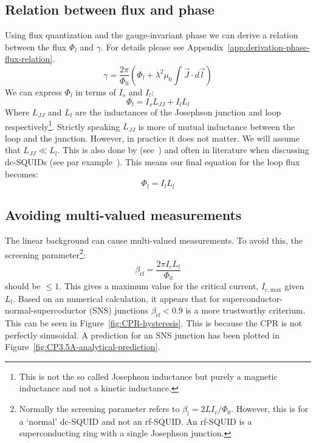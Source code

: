 \subsection{Relation between flux and phase}
\label{sec:flux-phase-relation}
Using flux quantization and the gauge-invariant phase we can derive a relation between the flux $\Phi_l$ and $\gamma$. For details please see Appendix~\ref{app:derivation-phase-flux-relation}.
\begin{equation}
	\gamma = \frac{2\pi}{\Phi_0}\left(\Phi_l + \lambda^2\mu_0 \int \vec{J}\cdot d \vec{l} \right)
	\label{eqn:phase-flux-relation}
\end{equation}
We can express $\Phi_l$ in terms of $I_s$ and $I_l$:
\begin{equation}
	\Phi_l = I_sL_{JJ}  + I_lL_l
\end{equation}
Where $L_{JJ}$ and $L_l$ are the inductances of the Josephson junction and loop respectively\footnote{This is not the so called Josephson inductance but purely a magnetic inductance and not a kinetic inductance.}. Strictly speaking $L_{JJ}$ is more of mutual inductance between the loop and the junction. However, in practice it does not matter. We will assume that $L_{JJ} \ll L_l$. This is also done by \citeauthor{frolovMeasurementCurrentPhaseRelation2004} (see~\cite{frolovCurrentphaseRelationsJosephson2005,frolovMeasurementCurrentPhaseRelation2004}) and often in literature when discussing dc-SQUIDs (see par example~\cite{clarkeSQUIDHandbook2004}). This means our final equation for the loop flux becomes:
\begin{equation}
	\Phi_l = I_lL_l
\end{equation}

\subsection{Avoiding multi-valued measurements}
The linear background can cause multi-valued measurements. To avoid this, the screening parameter\footnote{Normally the screening parameter refers to $\beta_l = 2LI_c/\Phi_0$. However, this is for a `normal' dc-SQUID and not an rf-SQUID. An rf-SQUID is a superconducting ring with a single Josephson junction.}:
\begin{equation}
	\beta_{\text{rf}} = \frac{2\pi I_c L_l}{\Phi_0}
\end{equation}
should be $\leq 1$\cite{clarkeSQUIDHandbook2004,frolovMeasurementCurrentPhaseRelation2004}. This gives a maximum value for the critical current, $I_{c,\text{max}}$ given $L_l$. Based on an numerical calculation, it appears that for superconductor-normal-supercoductor (SNS) junctions $\beta_{\text{rf}} < 0.9$ is a more trustworthy criterium. This can be seen in Figure~\ref{fig:CPR-hysteresis}. This is because the CPR is not perfectly sinusoidal\cite{vermeerSTMbasedScanningSQUID2021,likharevSuperconductingWeakLinks1979}.  A prediction for an SNS junction has been plotted in Figure~\ref{fig:CP3.5A-analytical-prediction}.

